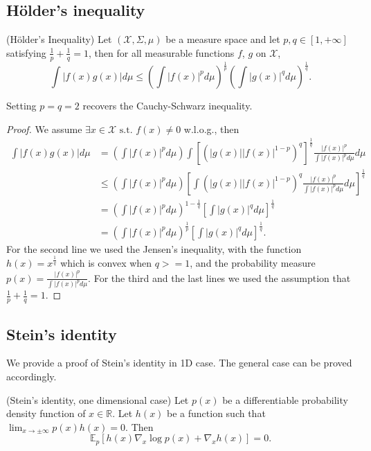 \subsection{H{\"o}lder's inequality}
\begin{prop}
(H{\"o}lder's Inequality)
Let $(\mathcal{X}, \Sigma, \mu)$ be a measure space and let $p, q \in [1, +\infty]$ satisfying $\frac{1}{p} + \frac{1}{q} = 1$, then for all measurable functions $f$, $g$ on $\mathcal{X}$,
$$ \int | f(x) g(x) | d \mu \leq \left( \int | f(x) |^p d \mu \right)^{\frac{1}{p}} \left( \int | g(x) |^q d \mu \right)^{\frac{1}{q}} .$$
\end{prop}
Setting $p = q = 2$ recovers the Cauchy-Schwarz inequality.
%
\begin{proof}
We assume $\exists x \in \mathcal{X} \text{ s.t. } f(x) \neq 0$ w.l.o.g., then
\begin{equation*}
\begin{aligned}
 \int | f(x) g(x) | d \mu &= \left( \int | f(x) |^p d \mu \right) \int [ ( | g(x) | | f(x) |^{1 - p} )^{q} ]^{\frac{1}{q}} \frac{|f(x)|^p}{ \int | f(x) |^p d \mu } d \mu \\
 &\leq \left( \int | f(x) |^p d \mu \right) \left[ \int ( | g(x) | | f(x) |^{1 - p} )^{q} \frac{|f(x)|^p}{ \int | f(x) |^p d \mu } d \mu \right]^{\frac{1}{q}} \\
 &= \left( \int | f(x) |^p d \mu \right)^{1 - \frac{1}{q}} \left[ \int | g(x) |^{q} d \mu \right]^{\frac{1}{q}} \\
 &= \left( \int | f(x) |^p d \mu \right)^{\frac{1}{p}} \left[ \int | g(x) |^{q} d \mu \right]^{\frac{1}{q}}.
\end{aligned}
\end{equation*}
For the second line we used the Jensen's inequality, with the function $h(x) = x^{\frac{1}{q}}$ which is convex when $q >= 1$, and the probability measure $p(x) = \frac{|f(x)|^p}{ \int | f(x) |^p d \mu }$. For the third and the last lines we used the assumption that $\frac{1}{p} + \frac{1}{q} = 1$.
\end{proof}

\subsection{Stein's identity}
We provide a proof of Stein's identity in 1D case. The general case can be proved accordingly.
\begin{prop}
(Stein's identity, one dimensional case)
Let $p(x)$ be a differentiable probability density function of $x \in \mathbb{R}$. Let $h(x)$ be a function such that $\lim_{x \rightarrow \pm \infty} p(x) h(x) = 0$. Then
$$\mathbb{E}_{p}[h(x) \nabla_{x} \log p(x) + \nabla_{x} h(x) ] = 0 .$$ 
\end{prop}

